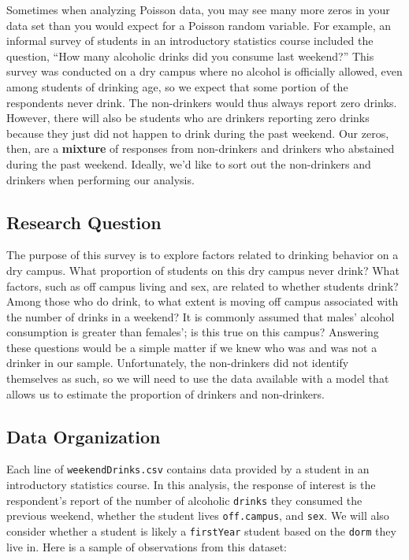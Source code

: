\documentclass[
]{krantz}
\begin{document}
Sometimes when analyzing Poisson data, you may see many more zeros in your data set than you would expect for a Poisson random variable. For example, an informal survey of students in an introductory statistics course included the question, ``How many alcoholic drinks did you consume last weekend?'' This survey was conducted on a dry campus where no alcohol is officially allowed, even among students of drinking age, so we expect that some portion of the respondents never drink. The non-drinkers would thus always report zero drinks. However, there will also be students who are drinkers reporting zero drinks because they just did not happen to drink during the past weekend. Our zeros, then, are a \textbf{mixture} of responses from non-drinkers and drinkers who abstained during the past weekend. Ideally, we'd like to sort out the non-drinkers and drinkers when performing our analysis.

\hypertarget{research-question}{%
\subsection{Research Question}\label{research-question}}

The purpose of this survey is to explore factors related to drinking behavior on a dry campus. What proportion of students on this dry campus never drink? What factors, such as off campus living and sex, are related to whether students drink? Among those who do drink, to what extent is moving off campus associated with the number of drinks in a weekend? It is commonly assumed that males' alcohol consumption is greater than females'; is this true on this campus? Answering these questions would be a simple matter if we knew who was and was not a drinker in our sample. Unfortunately, the non-drinkers did not identify themselves as such, so we will need to use the data available with a model that allows us to estimate the proportion of drinkers and non-drinkers.

\hypertarget{data-organization-2}{%
\subsection{Data Organization}\label{data-organization-2}}

Each line of \texttt{weekendDrinks.csv} contains data provided by a student in an introductory statistics course. In this analysis, the response of interest is the respondent's report of the number of alcoholic \texttt{drinks} they consumed the previous weekend, whether the student lives \texttt{off.campus}, and \texttt{sex}. We will also consider whether a student is likely a \texttt{firstYear} student based on the \texttt{dorm} they live in. Here is a sample of observations from this dataset:
\end{document}

